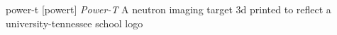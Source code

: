\newglsXterm%
{power-t}%
[powert]%
{\textit{Power{\--}T}}%
{A neutron imaging target \gls{3d} printed to reflect a \gls{university-tennessee} school logo}%